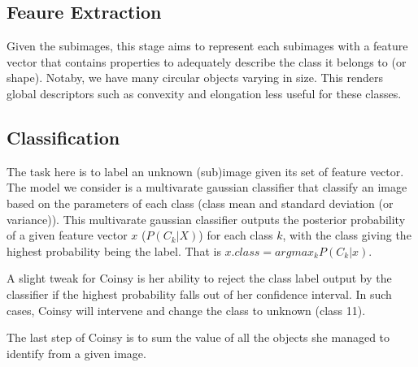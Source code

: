 \documentclass[main.tex]{subfiles}
\begin{document}
\subsection*{Feaure Extraction}
Given the subimages, this stage aims to represent each subimages with a feature vector that contains properties to adequately describe the class it belongs to (or shape). Notaby, we have many circular objects varying in size. This renders global descriptors such as convexity and elongation less useful for these classes.

\subsection*{Classification}
The task here is to label an unknown (sub)image given its set of feature vector. The model we consider is a multivarate gaussian classifier that classify an image based on the parameters of each class (class mean and standard deviation (or variance)). This multivarate gaussian classifier outputs the posterior probability of a given feature vector $x$ ($P(C_{k}|X)$) for each class $k$, with the class giving the highest probability being the label. That is $x.class = argmax_{k} P(C_{k}|x)$.

A slight tweak for Coinsy is her ability to reject the class label output by the classifier if the highest probability falls out of her confidence interval. In such cases, Coinsy will intervene and change the class to unknown (class 11).

The last step of Coinsy is to sum the value of all the objects she managed to identify from a given image.
\end{document}
